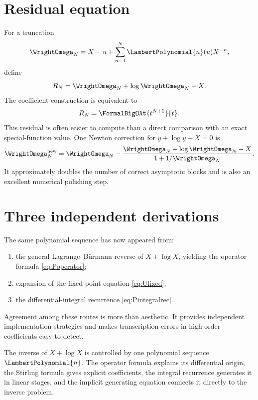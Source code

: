 \documentclass[11pt,oneside,openany]{book}
\begin{document}
\section{Residual equation}
For a truncation
\[
 \WrightOmega_N=X-u+\sum_{n=1}^{N}\LambertPolynomial{n}(u)X^{-n},
\]
define
\begin{equation}\label{eq:omegaresidual}
 R_N=\WrightOmega_N+\log\WrightOmega_N-X.
\end{equation}
The coefficient construction is equivalent to
\begin{equation}\label{eq:omegaresidualorder}
 R_N=\FormalBigOAt{t^{N+1}}{t}.
\end{equation}
This residual is often easier to compute than a direct comparison with an
exact special-function value.  One Newton correction for
\(y+\log y-X=0\) is
\begin{equation}\label{eq:omeganewtonpolish}
 \WrightOmega_N^{\mathrm{new}}
 =\WrightOmega_N-
 \frac{\WrightOmega_N+\log\WrightOmega_N-X}
      {1+1/\WrightOmega_N}.
\end{equation}
It approximately doubles the number of correct asymptotic blocks and is also
an excellent numerical polishing step.

\section{Three independent derivations}
The same polynomial sequence has now appeared from:
\begin{enumerate}
\item the general Lagrange--Bürmann reverse of \(X+\log X\), yielding the
operator formula \cref{eq:Poperator};
\item expansion of the fixed-point equation \cref{eq:Ufixed};
\item the differential-integral recurrence \cref{eq:Pintegralrec}.
\end{enumerate}
Agreement among these routes is more than aesthetic.  It provides independent
implementation strategies and makes transcription errors in high-order
coefficients easy to detect.

\begin{summarybox}
The inverse of \(X+\log X\) is controlled by one polynomial sequence
\(\LambertPolynomial{n}\).  The operator formula explains its differential origin, the Stirling
formula gives explicit coefficients, the integral recurrence generates it in
linear stages, and the implicit generating equation connects it directly to
the inverse problem.
\end{summarybox}
\end{document}
